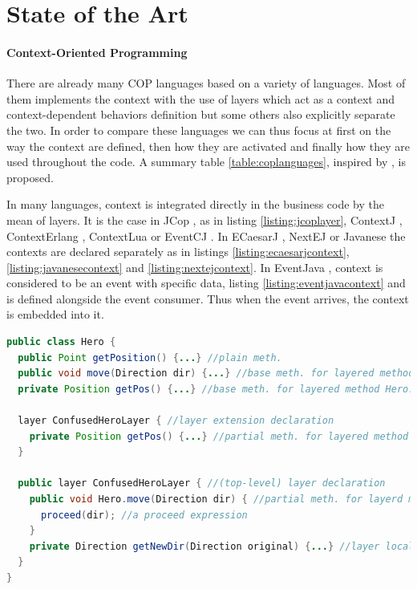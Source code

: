 \documentclass[a4paper]{article}
\begin{document}
\section{State of the Art}
\label{section:stateoftheart}
\paragraph{Context-Oriented Programming}
There are already many COP languages based on a variety of languages. Most of them implements the context with the use of layers which act as a context and context-dependent behaviors definition but some others also explicitly separate the two. In order to compare these languages we can thus focus at first on the way the context are defined, then how they are activated and finally how they are used throughout the code. A summary table \ref{table:coplanguages}, inspired by \cite{appeltauer_comparison_2009}, is proposed.

In many languages, context is integrated directly in the business code by the mean of layers. It is the case in JCop \cite{appeltauer_declarative_2012}, as in listing \ref{listing:jcoplayer}, ContextJ \cite{appeltauer_dedicated_2008} \cite{appeltauer_improving_2009}, ContextErlang \cite{ghezzi_context_2010}, ContextLua \cite{wasty_contextlua:_2010} or EventCJ \cite{kamina_eventcj:_2011}. In ECaesarJ \cite{nunez_declarative_2009}, NextEJ \cite{kamina_towards_2009} or Javanese \cite{kamina_unified_2013} the contexts are declared separately as in listings \ref{listing:ecaesarjcontext}, \ref{listing:javanesecontext} and \ref{listing:nextejcontext}. In EventJava \cite{jayaram_context-oriented_2009}, context is considered to be an event with specific data, listing \ref{listing:eventjavacontext} and is defined alongside the event consumer. Thus when the event arrives, the context is embedded into it.

\begin{lstlisting}[float, language=Java, caption=JCop layer example, label={listing:jcoplayer}]
public class Hero {
  public Point getPosition() {...} //plain meth.
  public void move(Direction dir) {...} //base meth. for layered method Hero.move
  private Position getPos() {...} //base meth. for layered method Hero.getPos
  
  layer ConfusedHeroLayer { //layer extension declaration
    private Position getPos() {...} //partial meth. for layered method Hero.getPos
  }

  public layer ConfusedHeroLayer { //(top-level) layer declaration
    public void Hero.move(Direction dir) { //partial meth. for layerd meth. Hero.move
      proceed(dir); //a proceed expression
    }
    private Direction getNewDir(Direction original) {...} //layer local method
  }
}
\end{lstlisting}
\end{document}
